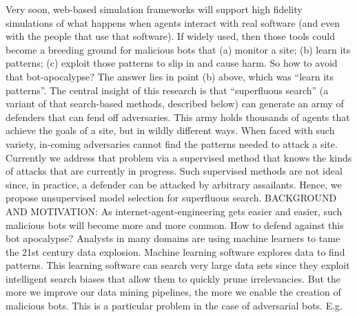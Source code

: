 

Very soon, web-based simulation frameworks will support high fidelity simulations of what happens when agents interact with real software (and even with the people that use that software). If widely used, then those tools could become a breeding ground for malicious bots that (a) monitor a site; (b) learn its patterns; (c) exploit those patterns to slip in and cause harm.  So how to avoid that bot-apocalypse? The answer lies in point (b) above, which was “learn its patterns”. The central insight of this research is that “superfluous search” (a variant of that search-based methods, described below) can generate an army of defenders that can fend off adversaries. This army holds thousands of agents that achieve the goals of a site, but in wildly different ways. When faced with such variety, in-coming adversaries cannot find the patterns needed to attack a site. Currently we address that problem via a supervised method that knows the kinds of attacks that are currently in progress. Such supervised methods are not ideal since, in practice, a defender can be attacked by arbitrary assailants.  Hence, we propose unsupervised model selection for superfluous search.   
BACKGROUND AND MOTIVATION:  As internet-agent-engineering gets easier and easier, such malicious bots will become more and more common.  How to defend against this bot apocalypse?
      Analysts in many domains are using machine learners to tame the 21st century data explosion. Machine learning software explores data to find patterns. This learning software can search very large data sets since they exploit intelligent search biases that allow them to quickly prune irrelevancies. But the more we improve our data mining pipelines, the more we enable the creation of malicious bots. This is a particular problem in the case of adversarial bots. E.g. 


 
 
    

 


